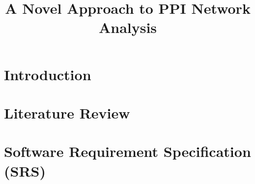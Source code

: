 \documentclass[11pt,twosided]{report}
\title{A Novel Approach to PPI Network Analysis}
\begin{document}




\tableofcontents

\chapter{Introduction}
\label{chap:intro}


\chapter{Literature Review}
\label{chap:lit}


\chapter{Software Requirement Specification (SRS)}
\label{chap:srs}

    


% 
\end{document}
